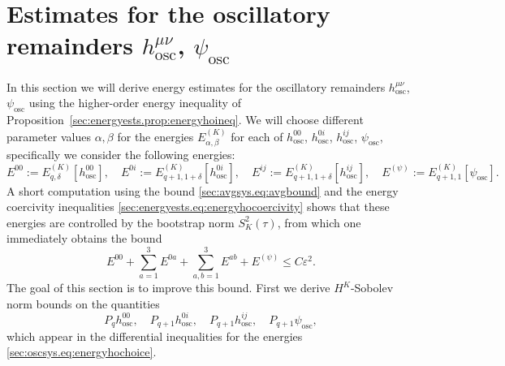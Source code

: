 \documentclass{article}
\newcommand{\osc}{\mathrm{osc}}
\newcommand{\ve}{\varepsilon}
\begin{document}
\section{Estimates for the oscillatory remainders \texorpdfstring{$h_{\osc}^{\mu\nu}$, $\psi_{\osc}$}{ }}\label{sec:oscsys}
In this section we will derive energy estimates for the oscillatory remainders $h_{\osc}^{\mu\nu}$, $\psi_{\osc}$ using the higher-order energy inequality of Proposition~\ref{sec:energyests.prop:energyhoineq}. We will choose different parameter values $\alpha,\beta$ for the energies $E_{\alpha,\beta}^{(K)}$ for each of $h_{\osc}^{00}$, $h_{\osc}^{0i}$, $h_{\osc}^{ij}$, $\psi_{\osc}$, specifically we consider the following energies:
\begin{equation}\label{sec:oscsys.eq:energyhochoice}
    E^{00}:= E_{q,\delta}^{(K)}[h_{\osc}^{00}],\quad E^{0i}:= E_{q+1,1+\delta}^{(K)}[h_{\osc}^{0i}],\quad E^{ij}:= E_{q+1,1+\delta}^{(K)}[h_{\osc}^{ij}],\quad E^{(\psi)}:= E_{q+1,1}^{(K)}[\psi_{\osc}].
\end{equation}
A short computation using the bound \eqref{sec:avgsys.eq:avgbound} and the energy coercivity inequalities \eqref{sec:energyests.eq:energyhocoercivity} shows that these energies are controlled by the bootstrap norm $S_K^2(\tau)$, from which one immediately obtains the bound
\begin{equation}\label{sec:oscsys.eq:oscroughest}
    E^{00} + \sum_{a=1}^3 E^{0a} + \sum_{a,b=1}^3 E^{ab} + E^{(\psi)} \leq C\ve^2.
\end{equation}
The goal of this section is to improve this bound. First we derive $H^K$-Sobolev norm bounds on the quantities 
\begin{equation}\label{sec:oscsys.eq:oscwaveop}
P_q h_{\osc}^{00}, \quad P_{q+1} h_{\osc}^{0i}, \quad P_{q+1} h_{\osc}^{ij},\quad  P_{q+1} \psi_{\osc},
\end{equation}
which appear in the differential inequalities for the energies \eqref{sec:oscsys.eq:energyhochoice}.
\end{document}
